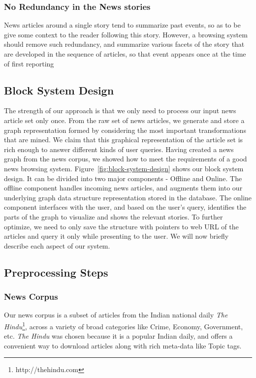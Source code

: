 \subsubsection{No Redundancy in the News stories}
News articles around a single story tend to summarize past events, so as to be give some 
context to the reader following this story. However, a browsing system should remove such redundancy, and summarize various facets of the story
that are developed in the sequence of articles, so that event appears once at the time of first reporting
\subsection{Block System Design}
\label{sec:block}

The strength of our approach is that we only need to process our input news article set only once. From the raw set of news articles, we
generate and store a graph representation formed by considering the most important transformations that are mined. We claim that this graphical 
representation of the article set is rich enough to answer different kinds of user queries. Having created a news graph from the news corpus, we showed how to meet the requirements of a good news browsing system.
Figure~\ref{fig:block-system-design} shows our block system design. It can be divided into
two major components - Offline and Online. The offline component handles incoming news articles, and augments them into our underlying graph data structure representation stored
in the database. The online component interfaces with the user, and based on the user's query, identifies the parts of the graph to visualize and 
shows the relevant stories. To further optimize, we need to only save the structure with pointers to web URL of the articles and query it only while presenting to the user. We will now briefly describe each aspect of our system.
\subsection{Preprocessing Steps}
\subsubsection*{News Corpus}
Our news corpus is a subset of articles from the Indian national daily {\em The Hindu}\footnote{http://thehindu.com}, across a variety of broad categories like Crime, Economy, Government, etc. 
{\em The Hindu} was chosen because it is a popular Indian daily, and offers a convenient way to download articles along with rich meta-data like Topic tags.
